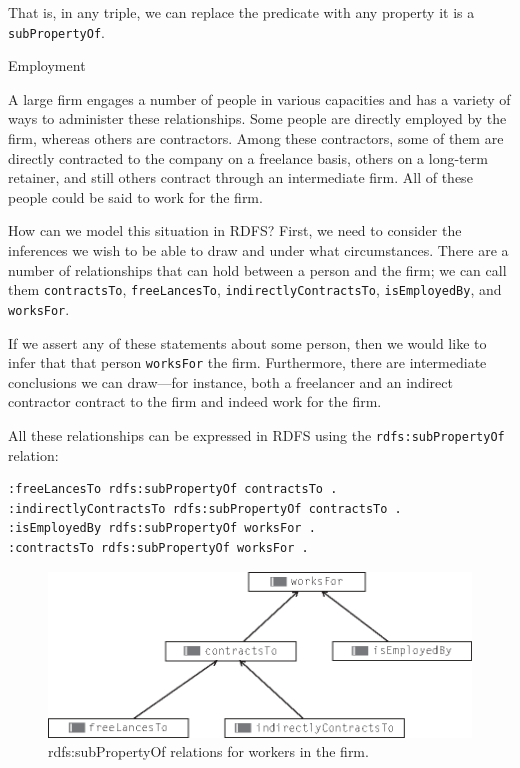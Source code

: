 That is, in any triple, we can replace the predicate with any property
it is a \texttt{subPropertyOf}.

\begin{example}{Employment}

A large firm engages a number of people in various capacities and has a
variety of ways to administer these relationships. Some people are
directly employed by the firm, whereas others are contractors. Among
these contractors, some of them are directly contracted to the company
on a freelance basis, others on a long-term retainer, and still others
contract through an intermediate firm. All of these people could be said
to work for the firm.

How can we model this situation in RDFS? First, we need to consider the
inferences we wish to be able to
draw and under what circumstances. There are a number of relationships
that can hold between a person and the firm; we can call them
\texttt{contractsTo}, \texttt{freeLancesTo}, \texttt{indirectlyContractsTo}, \texttt{isEmployedBy}, and
\texttt{worksFor}.

If we assert any of these statements about some person, then we would
like to infer that that person
\texttt{worksFor} the firm. Furthermore, there are intermediate conclusions we
can draw---for instance, both a freelancer and an indirect contractor
contract to the firm and indeed work for the firm.

All these relationships can be expressed in RDFS using the
\texttt{rdfs:subPropertyOf} relation:

\begin{lstlisting}
:freeLancesTo rdfs:subPropertyOf contractsTo .
:indirectlyContractsTo rdfs:subPropertyOf contractsTo .
:isEmployedBy rdfs:subPropertyOf worksFor .
:contractsTo rdfs:subPropertyOf worksFor .
\end{lstlisting}

\begin{figure}
\centering
\includegraphics[width=5in]{media/ch8/f08-1.eps}
\caption{rdfs:subPropertyOf relations for workers in the firm.}
\label{fig:ch8.1}
\end{figure}



\end{example}
